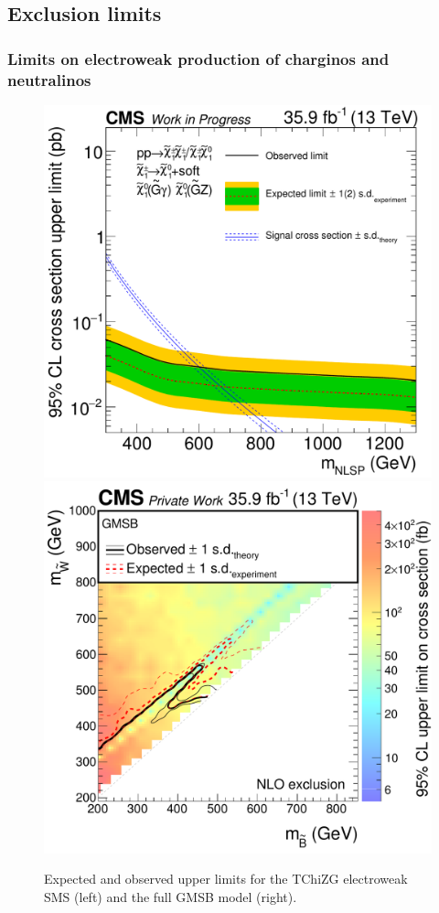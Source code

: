 \subsection{Exclusion limits}

\subsubsection*{Limits on electroweak production of charginos and neutralinos}
\begin{figure}[tbp]
 \centering
 \includegraphics[width=\pairwidth]{figures/UnblindingPlots/TChiNG_limit2}
 \includegraphics[width=\pairwidth]{figures/UnblindingPlots/GMSB_limits_XSEC2}
 \caption{Expected and observed upper limits for the TChiZG electroweak SMS (left) and the full GMSB model (right).}
 \label{fig:limitEWK}
\end{figure}


